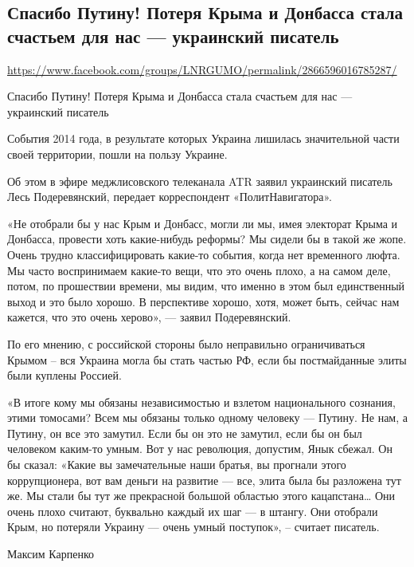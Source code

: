 
 
\subsection{Спасибо Путину! Потеря Крыма и Донбасса стала счастьем для нас --- украинский писатель}
\url{https://www.facebook.com/groups/LNRGUMO/permalink/2866596016785287/}


Спасибо Путину! Потеря Крыма и Донбасса стала счастьем для нас --- украинский писатель

События 2014 года, в результате которых Украина лишилась значительной части
своей территории, пошли на пользу Украине.

Об этом в эфире меджлисовского телеканала ATR заявил украинский писатель Лесь
Подеревянский, передает корреспондент «ПолитНавигатора».

«Не отобрали бы у нас Крым и Донбасс, могли ли мы, имея электорат Крыма и
Донбасса, провести хоть какие-нибудь реформы? Мы сидели бы в такой же жопе.
Очень трудно классифицировать какие-то события, когда нет временного люфта. Мы
часто воспринимаем какие-то вещи, что это очень плохо, а на самом деле, потом,
по прошествии времени, мы видим, что именно в этом был единственный выход и это
было хорошо. В перспективе хорошо, хотя, может быть, сейчас нам кажется, что
это очень херово», --- заявил Подеревянский.

По его мнению, с российской стороны было неправильно ограничиваться Крымом –
вся Украина могла бы стать частью РФ, если бы постмайданные элиты были куплены
Россией.

«В итоге кому мы обязаны независимостью и взлетом национального сознания, этими
томосами? Всем мы обязаны только одному человеку --- Путину. Не нам, а Путину, он
все это замутил. Если бы он это не замутил, если бы он был человеком каким-то
умным. Вот у нас революция, допустим, Янык сбежал. Он бы сказал: «Какие вы
замечательные наши братья, вы прогнали этого коррупционера, вот вам деньги на
развитие --- все, элита была бы разложена тут же. Мы стали бы тут же прекрасной
большой областью этого кацапстана… Они очень плохо считают, буквально каждый их
шаг --- в штангу. Они отобрали Крым, но потеряли Украину --- очень умный поступок»,
– считает писатель.

Максим Карпенко
  
